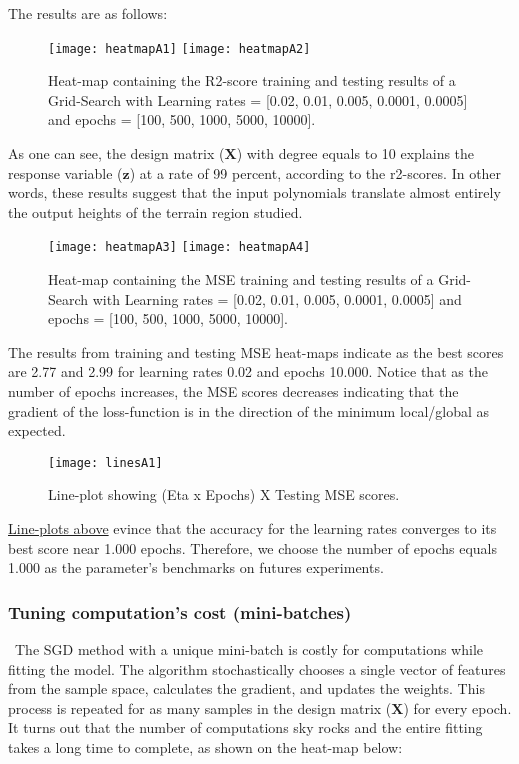 The results are as follows:

\begin{figure}[H]
\label{fig:figA1}
\centering
\texttt{[image: heatmapA1]}
\texttt{[image: heatmapA2]}
\caption{Heat-map containing the R2-score training and testing results of a Grid-Search with Learning rates = [0.02, 0.01, 0.005, 0.0001, 0.0005] and epochs = [100, 500, 1000, 5000, 10000].}
\end{figure}

As one can see, the design matrix ($\boldsymbol{X}$) with degree equals to 10 explains the response variable ($\boldsymbol{z}$) at a rate of 99 percent, according to the r2-scores. In other words, these results suggest that the input polynomials translate almost entirely the output heights of the terrain region studied.

\begin{figure}[H]
\label{fig:figA2}
\centering
\texttt{[image: heatmapA3]}
\texttt{[image: heatmapA4]}
\caption{Heat-map containing the MSE training and testing results of a Grid-Search with Learning rates = [0.02, 0.01, 0.005, 0.0001, 0.0005] and epochs = [100, 500, 1000, 5000, 10000]. }
\end{figure}

The results from training and testing MSE heat-maps indicate as the best scores are 2.77 and 2.99 for learning rates 0.02 and epochs 10.000. Notice that as the number of epochs increases, the MSE scores decreases indicating that the gradient of the loss-function is in the direction of the minimum local/global as expected. 

\begin{figure}[H]
\label{fig:figA3}
\centering
\texttt{[image: linesA1]}
\caption{Line-plot showing (Eta x Epochs) X Testing MSE scores. }
\end{figure}

\hyperref[fig:figA3]{Line-plots above} evince that the accuracy for the learning rates converges to its best score near 1.000 epochs. Therefore, we choose the number of epochs equals 1.000 as the parameter's benchmarks on futures experiments.

\subsubsection{Tuning computation's cost (mini-batches)}
\label{chap:Tuning computation's cost (mini-batches)}

\qquad \, The SGD method with a unique mini-batch is costly for computations while fitting the model. The algorithm stochastically chooses a single vector of features from the sample space, calculates the gradient, and updates the weights. This process is repeated for as many samples in the design matrix ($\boldsymbol{X}$) for every epoch. It turns out that the number of computations sky rocks and the entire fitting takes a long time to complete, as shown on the heat-map below:

